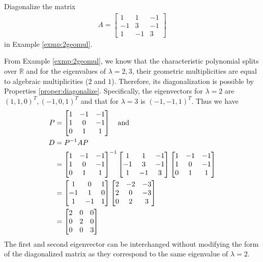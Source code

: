 \begin{exmp}
Diagonalize the matrix 
\begin{align*}
A = \begin{bmatrix}
1 & 1 & -1 \\
-1 & 3 & -1 \\
1 & -1 & 3
\end{bmatrix}
\end{align*}
in Example \ref{exmp:2geomul}.
\end{exmp}
\begin{solution}
From Example \ref{exmp:2geomul}, we know that the characteristic polynomial splits over $\mathbb{R}$ and for the eigenvalues of $\lambda = 2,3$, their geometric multiplicities are equal to algebraic multiplicities ($2$ and $1$). Therefore, its diagonalization is possible by Properties \ref{proper:diagonalize}. Specifically, the eigenvectors for $\lambda = 2$ are $(1,1,0)^T, (-1,0,1)^T$ and that for $\lambda = 3$ is $(-1,-1,1)^T$. Thus we have
\begin{align*}
P &= 
\begin{bmatrix}
1 & -1 & -1 \\
1 & 0 & -1 \\
0 & 1 & 1
\end{bmatrix}
\text{\quad and} \\
D &= P^{-1}AP \\
&= \begin{bmatrix}
1 & -1 & -1 \\
1 & 0 & -1 \\
0 & 1 & 1
\end{bmatrix}^{-1}
\begin{bmatrix}
1 & 1 & -1 \\
-1 & 3 & -1 \\
1 & -1 & 3
\end{bmatrix}
 \begin{bmatrix}
1 & -1 & -1 \\
1 & 0 & -1 \\
0 & 1 & 1
\end{bmatrix} \\
&= 
\begin{bmatrix}
1 & 0 & 1 \\
-1 & 1 & 0 \\
1 & -1 & 1
\end{bmatrix}
\begin{bmatrix}
2 & -2 & -3 \\
2 & 0 & -3 \\
0 & 2 & 3
\end{bmatrix} \\
&= 
\begin{bmatrix}
2 & 0 & 0 \\
0 & 2 & 0 \\
0 & 0 & 3
\end{bmatrix}
\end{align*}
The first and second eigenvector can be interchanged without modifying the form of the diagonalized matrix as they correspond to the same eigenvalue of $\lambda = 2$.
\end{solution}

